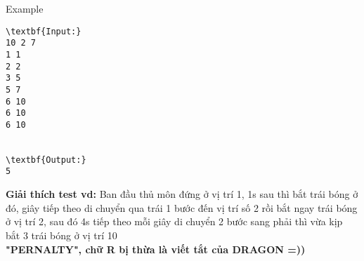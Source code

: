 Example
\begin{verbatim}
\textbf{Input:}
10 2 7
1 1
2 2
3 5
5 7
6 10
6 10
6 10


\textbf{Output:}
5
\end{verbatim}

\textbf{    Giải thích test vd:   }   Ban đầu thủ môn đứng ở vị trí 1, 1s sau thì bắt trái bóng ở đó, giây tiếp theo di chuyển qua trái 1 bước đến vị trí số 2 rồi bắt ngay trái bóng ở vị trí 2, sau đó 4s tiếp theo mỗi giây di chuyển 2 bước sang phải thì vừa kịp bắt 3 trái bóng ở vị trí 10   
\\\textbf{    "PERNALTY", chữ R bị thừa là viết tắt của DRAGON =))   }